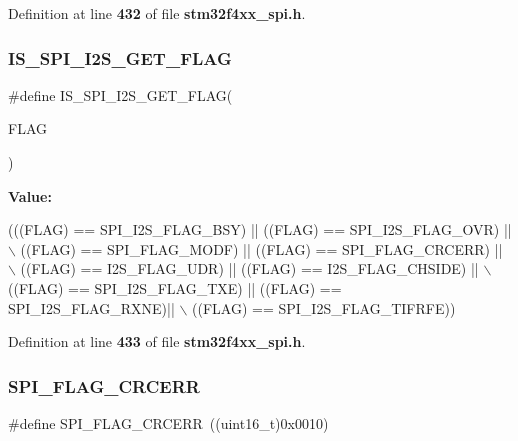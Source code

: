 Definition at line \textbf{ 432} of file \textbf{ stm32f4xx\+\_\+spi.\+h}.

\mbox{\label{group__SPI__I2S__flags__definition_ga1241471a018bc63ed140089ce8334b4f}} 
\subsubsection{I\+S\+\_\+\+S\+P\+I\+\_\+\+I2\+S\+\_\+\+G\+E\+T\+\_\+\+F\+L\+AG}
{\footnotesize\ttfamily \#define I\+S\+\_\+\+S\+P\+I\+\_\+\+I2\+S\+\_\+\+G\+E\+T\+\_\+\+F\+L\+AG(\begin{DoxyParamCaption}\item[{}]{F\+L\+AG }\end{DoxyParamCaption})}

{\bfseries Value\+:}
\begin{DoxyCode}
(((FLAG) == SPI_I2S_FLAG_BSY) || ((FLAG) == SPI_I2S_FLAG_OVR) || \(\backslash\)
                                   ((FLAG) == SPI_FLAG_MODF) || ((FLAG) == 
      SPI_FLAG_CRCERR) || \(\backslash\)
                                   ((FLAG) == I2S_FLAG_UDR) || ((FLAG) == 
      I2S_FLAG_CHSIDE) || \(\backslash\)
                                   ((FLAG) == SPI_I2S_FLAG_TXE) || ((FLAG) == 
      SPI_I2S_FLAG_RXNE)|| \(\backslash\)
                                   ((FLAG) == SPI_I2S_FLAG_TIFRFE))
\end{DoxyCode}


Definition at line \textbf{ 433} of file \textbf{ stm32f4xx\+\_\+spi.\+h}.

\mbox{\label{group__SPI__I2S__flags__definition_ga30fb6af50e1f3c61cb9de76b0101c889}} 
\subsubsection{S\+P\+I\+\_\+\+F\+L\+A\+G\+\_\+\+C\+R\+C\+E\+RR}
{\footnotesize\ttfamily \#define S\+P\+I\+\_\+\+F\+L\+A\+G\+\_\+\+C\+R\+C\+E\+RR~((uint16\+\_\+t)0x0010)}



